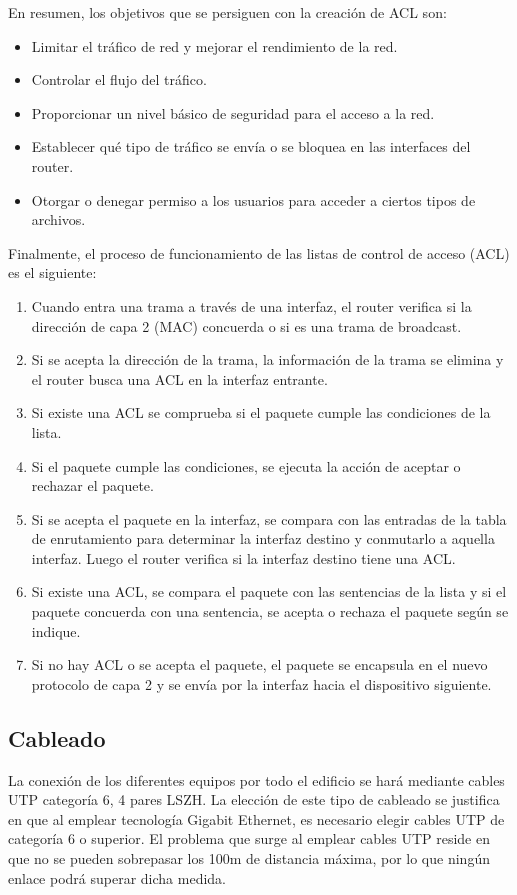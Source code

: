 \documentclass[a4paper,10pt]{article}
\begin{document}
En resumen, los objetivos que se persiguen con la creación de ACL son:
\begin{itemize}
	\item Limitar el tráfico de red y mejorar el rendimiento de la red.
    \item Controlar el flujo del tráfico.
    \item Proporcionar un nivel básico de seguridad para el acceso a la red. 
    \item Establecer qué tipo de tráfico se envía o se bloquea en las interfaces del router. 
    \item Otorgar o denegar permiso a los usuarios para acceder a ciertos tipos de archivos.
\end{itemize}
Finalmente, el proceso de funcionamiento de las listas de control de acceso (ACL) es el siguiente:
\begin{enumerate}
	\item Cuando entra una trama a través de una interfaz, el router verifica si la dirección de capa 2 (MAC) concuerda o si es una trama de broadcast. 
    \item Si se acepta la dirección de la trama, la información de la trama se elimina y el router busca una ACL en la interfaz entrante. 
    \item Si existe una ACL se comprueba si el paquete cumple las condiciones de la lista. 
    \item Si el paquete cumple las condiciones, se ejecuta la acción de aceptar o rechazar el paquete. 
    \item Si se acepta el paquete en la interfaz, se compara con las entradas de la tabla de enrutamiento para determinar la interfaz destino y conmutarlo a aquella interfaz. Luego el router verifica si la interfaz destino tiene una ACL.
    \item Si existe una ACL, se compara el paquete con las sentencias de la lista y si el paquete concuerda con una sentencia, se acepta o rechaza el paquete según se indique. 
    \item Si no hay ACL o se acepta el paquete, el paquete se encapsula en el nuevo protocolo de capa 2 y se envía por la interfaz hacia el dispositivo siguiente.
\end{enumerate}

\subsection{Cableado}
La conexión de los diferentes equipos por todo el edificio se 
hará mediante cables UTP categoría 6, 4 pares LSZH.
La elección de este tipo de cableado se justifica en que al  emplear tecnología Gigabit Ethernet, es necesario elegir cables UTP de categoría 6 o superior. El problema que surge al emplear cables UTP reside en que no se pueden sobrepasar los 100m de distancia máxima, por lo que ningún enlace podrá superar dicha medida.
\end{document}
